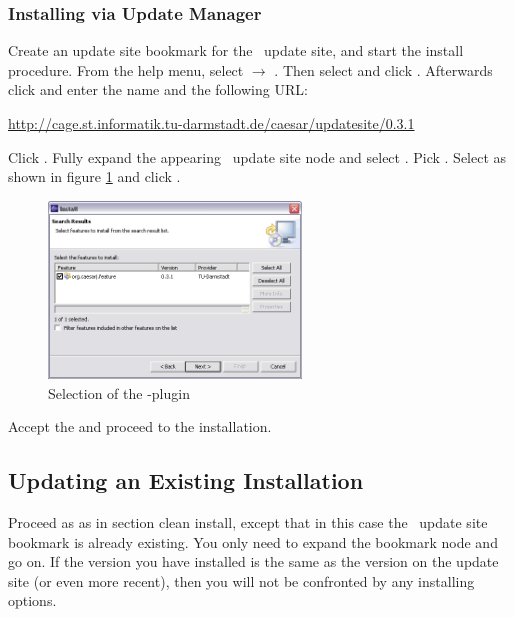 \subsubsection{Installing via Update Manager} 
Create an update site bookmark for the \cjdt ~update site, and start the install procedure.
From the help menu, select  $\rightarrow$ . Then select  and click .
Afterwards click  and enter the name  and the following URL:  
\begin{center}
\href{http://cage.st.informatik.tu-darmstadt.de/caesar/updatesite/0.3.1}{http://cage.st.informatik.tu-darmstadt.de/caesar/updatesite/0.3.1}
\end{center}
Click .
Fully expand the appearing \cjdt ~update site node and select \markedtext{\caesarj}. Pick
. Select  as shown in figure \ref{fig:installpage30} and click .\\

\begin{figure}[htbp]
	\centering
		\includegraphics[width=0.60\textwidth]{./images/install_page_3_0.png}
	\caption{Selection of the \caesarj -plugin}
	\label{fig:installpage30}
\end{figure}

Accept the  and proceed to the installation.

\subsection{Updating an Existing Installation}
Proceed as as in section clean install, except that in this case the \cjdt ~update site bookmark is already
existing. You only need to expand the bookmark node and go on. If the version you have
installed is the same as the version on the update site (or even more recent),
then you will not be confronted by any installing options.

